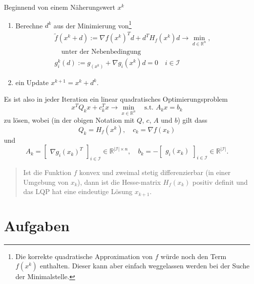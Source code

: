 \documentclass[]{book}
\providecommand{\tightlist}{%
  \setlength{\itemsep}{0pt}\setlength{\parskip}{0pt}}
\newenvironment {JHSAYS} [0] {\begin{quote}\color{jhsc}} {\end{quote}}
\theoremstyle{definition}
\theoremstyle{definition}
\theoremstyle{definition}
\theoremstyle{definition}
\theoremstyle{remark}
\begin{document}
Beginnend von einem Näherungswert \(x^k\)

\begin{enumerate}
\def\labelenumi{\arabic{enumi}.}
\tightlist
\item
  Berechne \(d^k\) aus der Minimierung von\footnote{Die korrekte quadratische Approximation von \(f\) würde noch den Term \(f(x^k)\) enthalten. Dieser kann aber einfach weggelassen werden bei der Suche der Minimalstelle.}
  \begin{align*}
  \tilde f(x^k+d):= \nabla f(x^k)^T d + d^TH_f(x^k) d \to \min_{d\in \mathbb R^{n}}, \\\quad \text{unter der Nebenbedingung} \\ g_i^k(d):=g_(x^k)+\nabla g_i(x^k)d = 0 \quad i \in \mathcal I
    \end{align*}
\item
  ein Update \(x^{k+1}=x^k+d^k\).
\end{enumerate}

Es ist also in jeder Iteration ein linear quadratisches Optimierungsproblem
\begin{equation*}
x^T Q_k x + c_k^Tx  \to \min_{x\in \mathbb R^{n}} \quad \text{s.t. }A_kx=b_k
\end{equation*}
zu lösen, wobei (in der obigen Notation mit \(Q\), \(c\), \(A\) und \(b\)) gilt dass
\begin{equation*}
Q_k=H_f(x^k), \quad c_k=\nabla f(x_k)
\end{equation*}
und
\begin{equation*}
A_k = 
\begin{bmatrix}
\nabla g_i(x_k)^T
\end{bmatrix}_{i \in \mathcal I} \in \mathbb R^{|\mathcal I| \times n},
\quad 
b_k = -
\begin{bmatrix}
g_i(x_k) 
\end{bmatrix}_{i \in \mathcal I}\in \mathbb R^{|\mathcal I|}.
\end{equation*}

\leavevmode\hypertarget{rem-conv-hesse}{}%
\begin{JHSAYS}
Ist die Funktion \(f\) konvex und zweimal stetig differenzierbar (in einer Umgebung von \(x_k\)), dann ist die Hesse-matrix \(H_f(x_k)\) positiv definit und das LQP hat eine eindeutige Lösung \(x_{k+1}\).

\end{JHSAYS}

\hypertarget{aufgaben-5}{%
\section{Aufgaben}\label{aufgaben-5}}
\end{document}
